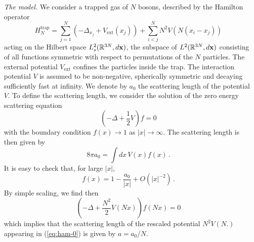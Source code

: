 \documentclass[11pt,a4paper]{article}
\newcommand{\bx}{{\bf x}}
\newcommand{\bR}{{\mathbb R}}
\begin{document}

\bigskip

{\it The model.} We consider a trapped gas of $N$ bosons, described by the Hamilton operator 
\begin{equation}\label{eq:ham-0}
H^{\text{trap}}_N = \sum_{j=1}^N \left(-\Delta_{x_j} +V_{\text{ext}} (x_j)\right) + \sum_{i<j}^N N^2 V (N (x_i - x_j)) 
\end{equation}
acting on the Hilbert space $L^2_s (\bR^{3N}, d\bx)$, the subspace of $L^2 (\bR^{3N}, d\bx)$ consisting of all functions symmetric with respect to permutations of the $N$ particles. The external potential $V_{\text{ext}}$ confines the particles inside the trap. The interaction potential $V$ is assumed to be non-negative, spherically symmetric and decaying sufficiently fast at infinity. We denote by $a_0$ the scattering length of the potential $V$. To define the scattering length, we consider the solution of the zero energy scattering equation 
\begin{equation}\label{eq:0en-0} \left( -\Delta + \frac{1}{2} V \right) f = 0 \end{equation}
with the boundary condition $f (x) \to 1$ as $|x| \to \infty$. The scattering length is then given by 
\begin{equation}\label{eq:8pia} 8 \pi a_0 = \int dx \, V(x) f(x) \, . \end{equation}
It is easy to check that, for large $|x|$, 
\begin{equation}\label{eq:f} f(x) = 1- \frac{a_0}{|x|} + O (|x|^{-2}) \, . \end{equation}
By simple scaling, we find then
\[ \left( -\Delta + \frac{N^2}{2} V(N x) \right) f (Nx) = 0 \]
which implies that the scattering length of the rescaled potential $N^2 V(N.)$ appearing in (\ref{eq:ham-0}) is given by $a=a_0/N$. 

\bigskip
\end{document}
